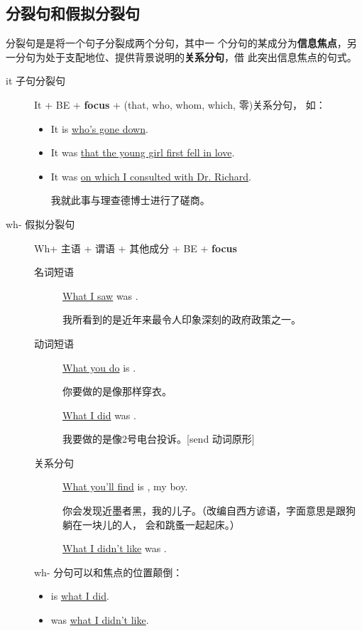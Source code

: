 \subsection{分裂句和假拟分裂句}

 分裂句是是将一个句子分裂成两个分句，其中一
个分句的某成分为\textbf{信息焦点}，另一分句为处于支配地位、提供背景说明的\textbf{关系分句}，借
此突出信息焦点的句式。

\begin{description}
\item[it 子句分裂句] It + BE + \textbf{focus} + (that, who, whom, which, 零)关系分句，
  如：
  \begin{itemize}
  \item It is  \uline{who’s gone down}.

  \item It was  \uline{that the young girl first fell in love}.


  \item It was  \uline{on which I consulted with Dr. Richard}.

    我就此事与理查德博士进行了磋商。
  \end{itemize}


\item[wh- 假拟分裂句] Wh+ 主语 + 谓语 + 其他成分 + BE + \textbf{focus}


  \begin{description}
  \item[名词短语] \uline{What I saw} was .

    我所看到的是近年来最令人印象深刻的政府政策之一。
  \item[动词短语] \uline{What you do} is .

    你要做的是像那样穿衣。

   \uline{What I did} was .

   我要做的是像2号电台投诉。[send 动词原形]

 \item[关系分句]
   \uline{What you’ll find} is , my boy.

   你会发现近墨者黑，我的儿子。（改编自西方谚语，字面意思是跟狗躺在一块儿的人，
   会和跳蚤一起起床。）

   \uline{What I didn’t like} was .

  \end{description}

  wh- 分句可以和焦点的位置颠倒：
  \begin{itemize}
  \item {} is \uline{what I did}.

  \item {} was \uline{what I didn’t like}.
  \end{itemize}
\end{description}

